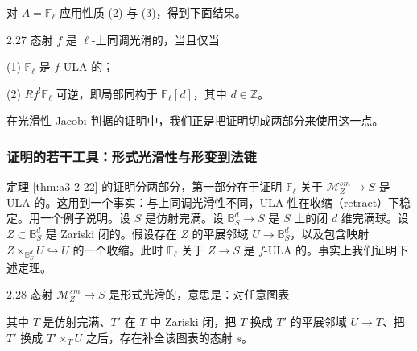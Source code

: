 对 $A=\mathbb F_\ell$ 应用性质 (2) 与 (3)，得到下面结果。
\begin{thm}{2.27}
态射 $f$ 是 $\ell$-上同调光滑的，当且仅当

(1) $\mathbb F_\ell$ 是 $f$-ULA 的；

(2) $Rf^!\mathbb F_\ell$ 可逆，即局部同构于 $\mathbb F_\ell[d]$，其中 $d\in\mathbb Z$。\label{thm:a3-2-27}
\end{thm}

在光滑性 Jacobi 判据的证明中，我们正是把证明切成两部分来使用这一点。

\subsubsection{证明的若干工具：形式光滑性与形变到法锥}

定理 \ref{thm:a3-2-22} 的证明分两部分，第一部分在于证明 $\mathbb F_\ell$ 关于 $\mathcal M_Z^{sm}\to S$ 是 ULA 的。这用到一个事实：与上同调光滑性不同，ULA 性在收缩（retract）下稳定。用一个例子说明。设 $S$ 是仿射完满。设 $\mathbb B^d_S\to S$ 是 $S$ 上的闭 $d$ 维完满球。设 $Z\subset\mathbb B^d_S$ 是 Zariski 闭的。假设存在 $Z$ 的平展邻域 $U\to\mathbb B^d_S$，以及包含映射 $Z\times_{\mathbb B^d_S}U\hookrightarrow U$ 的一个收缩。此时 $\mathbb F_\ell$ 关于 $Z\to S$ 是 $f$-ULA 的。事实上我们证明下述定理。
\begin{thm}{2.28}
态射 $\mathcal M_Z^{sm}\to S$ 是形式光滑的，意思是：对任意图表
\begin{center}
\end{center}
其中 $T$ 是仿射完满、$T'$ 在 $T$ 中 Zariski 闭，把 $T$ 换成 $T'$ 的平展邻域 $U\to T$、把 $T'$ 换成 $T'\times_T U$ 之后，存在补全该图表的态射 $s$。\label{thm:a3-2-28}
\end{thm}

